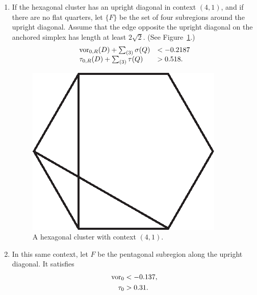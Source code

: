 \begin{enumerate}
\item\label{app:hex8} If the hexagonal cluster has an upright
diagonal in context $(4,1)$, and if there are no flat quarters,
let $\{F\}$ be the set of four subregions around the upright
diagonal. Assume that the edge opposite the upright diagonal on
the anchored simplex has length at least $2\sqrt2$.
 (See Figure~\ref{fig:hex41}.)
    $$
    \begin{array}{lll}
    \operatorname{vor}_{0,R}(D)+\sum_{(3)}\sigma(Q) &< -0.2187\\
    \tau_{0,R}(D)+\sum_{(3)}\tau(Q) &> 0.518.
    \end{array}
    $$
\begin{figure}[htb]
  \centering
  \includegraphics{PS/hex41.eps}
  \caption{A hexagonal cluster with context $(4,1)$.}
  \label{fig:hex41}
\end{figure}

\item\label{app:hex9} In this same context, let $F$ be the
pentagonal subregion along the upright diagonal. It satisfies
    \begin{eqnarray}
    \operatorname{vor}_0 &< -0.137,\\
    \tau_0 &> 0.31.
    \end{eqnarray}


\end{enumerate}
